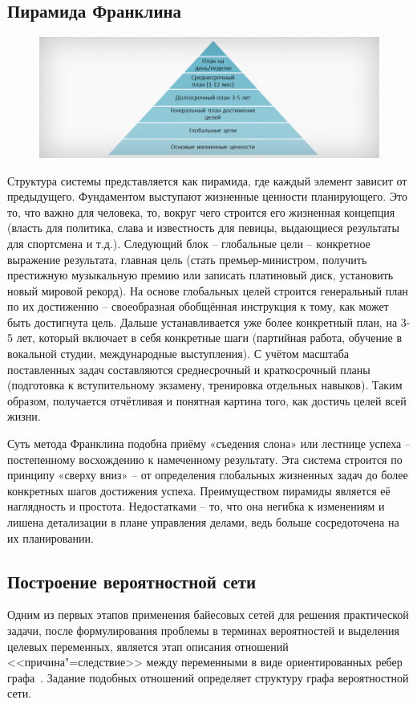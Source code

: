 \subsection{Пирамида Франклина}
\label{page:domain:piramida_franklina}
\begin{figure}[ht]
\centering
  \includegraphics[scale=0.5]{images/franklin_piramida.jpg}  
\end{figure}
Структура системы представляется как пирамида, где каждый элемент зависит от предыдущего. Фундаментом выступают жизненные ценности планирующего. Это то, что важно для человека, то, вокруг чего строится его жизненная концепция (власть для политика, слава и известность для певицы, выдающиеся результаты для спортсмена и т.д.). Следующий блок – глобальные цели – конкретное выражение результата, главная цель (стать премьер-министром, получить престижную музыкальную премию или записать платиновый диск, установить новый мировой рекорд). На основе глобальных целей строится генеральный план по их достижению – своеобразная обобщённая инструкция к тому, как может быть достигнута цель. Дальше устанавливается уже более конкретный план, на 3-5 лет, который включает в себя конкретные шаги (партийная работа, обучение в вокальной студии, международные выступления). С учётом масштаба поставленных задач составляются среднесрочный и краткосрочный планы (подготовка к вступительному экзамену, тренировка отдельных навыков). Таким образом, получается отчётливая и понятная картина того, как достичь целей всей жизни.

Суть метода Франклина подобна приёму «съедения слона» или лестнице успеха – постепенному восхождению к намеченному результату. Эта система строится по принципу «сверху вниз» – от определения глобальных жизненных задач до более конкретных шагов достижения успеха. Преимуществом пирамиды является её наглядность и простота. Недостатками – то, что она негибка к изменениям и лишена детализации в плане управления делами, ведь больше сосредоточена на их планировании.

\subsection{Построение вероятностной сети}
\label{sub:domain:learning_structure}
Одним из первых этапов применения байесовых сетей для решения практической задачи, после формулирования проблемы в терминах вероятностей и выделения целевых переменных, является этап описания отношений <<причина"=следствие>> между переменными в виде ориентированных ребер графа~\cite{terehov_2003}.
Задание подобных отношений определяет структуру графа вероятностной сети.

